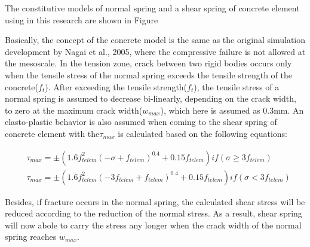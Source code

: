 The constitutive models of normal spring and a shear spring of concrete element using in this research are shown in Figure %

Basically, the concept of the concrete model is the same as the original simulation development by Nagai et al., 2005, where the compressive failure is not allowed at the mesoscale. In the tension zone, crack between two rigid bodies occurs only when the tensile stress of the normal spring exceeds the tensile strength of the concrete($f_t$). After exceeding the tensile strength($f_t$), the tensile stress of a normal spring is assumed to decrease bi-linearly, depending on the crack width, to zero at the maximum crack width($w_{max}$), which here is assumed as 0.3mm. An elasto-plastic behavior is also assumed when coming to the shear spring of concrete element with the$\tau_{max}$ is calculated based on the following equations:

\begin{equation}
  \begin{aligned}
  &\tau_{max} = \pm (1.6f_{telem}^2 (-\sigma + f_{telem})^0.4 + 0.15f_{telem}) if (\sigma \geq 3f_{telem})\\
  &\tau_{max} = \pm (1.6f_{telem}^2 (-3f_{telem} + f_{telem})^0.4 + 0.15f_{telem}) if (\sigma < 3f_{telem})
  \end{aligned}
\end{equation}

Besides, if fracture occurs in the normal spring, the calculated shear stress will be reduced according to the reduction of the normal stress. As a result, shear spring will now abole to carry the stress any longer when the crack width of the normal spring reaches $w_{max}$.
